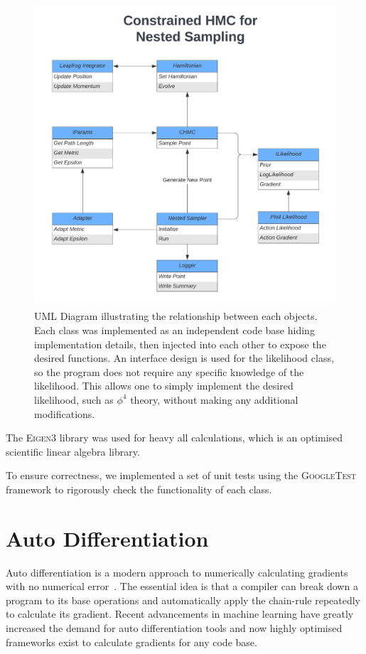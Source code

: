 \documentclass[11pt]{article}
\begin{document}
    \begin{figure}[h!]
        \center
        \includegraphics[width=\linewidth]{../figures/UML_Diagram}
        \caption{
            UML Diagram illustrating the relationship between each objects.
            Each class was implemented as an independent code base hiding implementation details, then injected into
            each other to expose the desired functions.
            An interface design is used for the likelihood class, so the program does not require any specific knowledge
            of the likelihood.
            This allows one to simply implement the desired likelihood, such as $\phi^4$ theory, without making any
            additional modifications.
        }\label{fig:uml_diagram}
    \end{figure}

    The \textsc{Eigen3} library was used for heavy all calculations, which is an optimised scientific
    linear algebra library.

    To ensure correctness, we implemented a set of unit tests using the \textsc{GoogleTest} framework to rigorously
    check the functionality of each class.

\section{Auto Differentiation}\label{sec:autodiff}
    Auto differentiation is a modern approach to numerically calculating gradients with no numerical
    error~\cite{carpenter2015stan}.
    The essential idea is that a compiler can break down a program to its base operations and automatically apply the
    chain-rule repeatedly to calculate its gradient.
    Recent advancements in machine learning have greatly increased the demand for auto differentiation tools and now
    highly optimised frameworks exist to calculate gradients for any code base.
\end{document}

